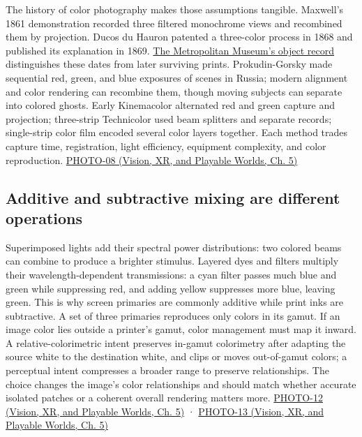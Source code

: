 The history of color photography makes those assumptions tangible. Maxwell's 1861 demonstration recorded three filtered monochrome views and recombined them by projection. Ducos du Hauron patented a three-color process in 1868 and published its explanation in 1869. \href{https://www.metmuseum.org/art/collection/search/286318}{The Metropolitan Museum's object record} distinguishes these dates from later surviving prints. Prokudin-Gorsky made sequential red, green, and blue exposures of scenes in Russia; modern alignment and color rendering can recombine them, though moving subjects can separate into colored ghosts. Early Kinemacolor alternated red and green capture and projection; three-strip Technicolor used beam splitters and separate records; single-strip color film encoded several color layers together. Each method trades capture time, registration, light efficiency, equipment complexity, and color reproduction. \href{../07-Vision-XR-and-Playable-Worlds/main.pdf\#nameddest=04-visual-computing-ii-ch036-photo-08---photography-session-08}{PHOTO-08 (Vision, XR, and Playable Worlds, Ch. 5)}

\subsection{Additive and subtractive mixing are different operations}\label{03-visual-computing-i-ch004-additive-and-subtractive-mixing-are-different-operations}

\hypertarget{03-visual-computing-i-ch004-additive-and-subtractive-mixing-are-different-operations}{}

Superimposed lights add their spectral power distributions: two colored beams can combine to produce a brighter stimulus. Layered dyes and filters multiply their wavelength-dependent transmissions: a cyan filter passes much blue and green while suppressing red, and adding yellow suppresses more blue, leaving green. This is why screen primaries are commonly additive while print inks are subtractive. A set of three primaries reproduces only colors in its gamut. If an image color lies outside a printer's gamut, color management must map it inward. A relative-colorimetric intent preserves in-gamut colorimetry after adapting the source white to the destination white, and clips or moves out-of-gamut colors; a perceptual intent compresses a broader range to preserve relationships. The choice changes the image's color relationships and should match whether accurate isolated patches or a coherent overall rendering matters more. \href{../07-Vision-XR-and-Playable-Worlds/main.pdf\#nameddest=04-visual-computing-ii-ch036-photo-12---photography-session-12}{PHOTO-12 (Vision, XR, and Playable Worlds, Ch. 5)} · \href{../07-Vision-XR-and-Playable-Worlds/main.pdf\#nameddest=04-visual-computing-ii-ch036-photo-13---photography-session-13}{PHOTO-13 (Vision, XR, and Playable Worlds, Ch. 5)}

